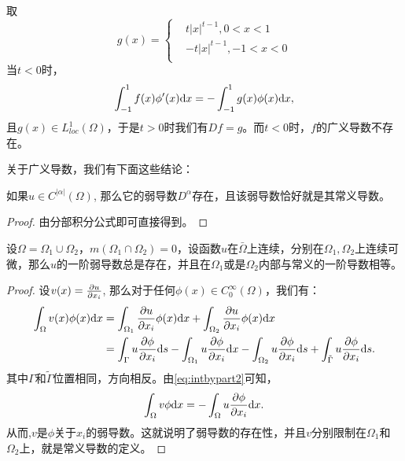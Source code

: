 取
\begin{equation}
    \label{eq:distribution1}
    g(x)=\left\{
        \begin{aligned}
        &t|x|^{t-1},0<x<1\\
        &-t|x|^{t-1},-1<x<0\\
        \end{aligned}
    \right.
\end{equation}
当$t<0$时，
\begin{equation}
    \int_{-1}^{1}f(x)\phi'(x)\mathrm{d} x=-\int_{-1}^{1}g(x)\phi(x)\mathrm{d} x,
\end{equation}
且$g(x)\in L_{loc}^{1}(\Omega)$，于是$t>0$时我们有$Df=g$。而$t<0$时，$f$的广义导数不存在。

关于广义导数，我们有下面这些结论：
\begin{proposition}
    如果$u\in C^{|\alpha|}(\Omega)$, 那么它的弱导数$D^{\alpha}$存在，且该弱导数恰好就是其常义导数。
\end{proposition}
\begin{proof}
    由分部积分公式即可直接得到。
\end{proof}
\begin{proposition}
    设$\Omega=\Omega_{1}\cup\Omega_{2}$，$m(\Omega_{1}\cap\Omega_{2})=0$，设函数$u$在$\bar{\Omega}$上连续，分别在$\Omega_{1},\Omega_{2}$上连续可微，那么$u$的一阶弱导数总是存在，并且在$\Omega_{1}$或是$\Omega_{2}$内部与常义的一阶导数相等。
\end{proposition}
\begin{proof}
    设$v(x)=\frac{\partial u}{\partial x_{i}}$, 那么对于任何$\phi(x)\in C_{0}^{\infty}(\Omega)$，我们有：
    \begin{equation}
        \label{eq:intbypart2}
        \begin{aligned}
            \int_{\Omega}v(x)\phi(x)\mathrm{d} x&=\int_{\Omega_{1}}\frac{\partial u}{\partial x_{i}}\phi(x)\mathrm{d} x+\int_{\Omega_{2}}\frac{\partial u}{\partial x_{i}}\phi(x)\mathrm{d} x\\
            &=\int_{\Gamma}u\frac{\partial \phi}{\partial x_{i}}\mathrm{d} s-\int_{\Omega_{1}}u\frac{\partial \phi}{\partial x_{i}}\mathrm{d} x-\int_{\Omega_{2}}u\frac{\partial \phi}{\partial x_{i}}\mathrm{d} s+\int_{\tilde{\Gamma}}u\frac{\partial \phi}{\partial x_{i}}\mathrm{d} s.
        \end{aligned}
    \end{equation}
    其中$\Gamma$和$\tilde{\Gamma}$位置相同，方向相反。由\eqref{eq:intbypart2}可知，
    \begin{equation}
        \int_{\Omega}v\phi\mathrm{d} x=-\int_{\Omega}u\frac{\partial \phi}{\partial x_{i}}\mathrm{d} x.
    \end{equation}
    从而,$v$是$\phi$关于$x_{i}$的弱导数。这就说明了弱导数的存在性，并且$v$分别限制在$\Omega_{1}$和$\Omega_{2}$上，就是常义导数的定义。
\end{proof}
